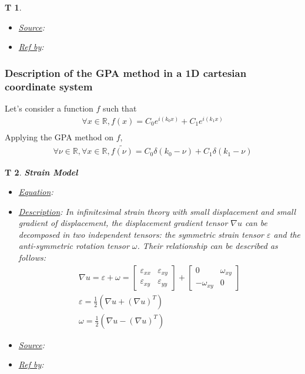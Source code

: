 \documentclass[12pt]{article}
\newtheorem{T}{T}
\begin{document}
\begin{T}
\begin{itemize}
\item \underline{Source}:
\item \underline{Ref by}:
\end{itemize}
\label{T_2}
\end{T}

\subsubsection*{Description of the GPA method in a 1D cartesian coordinate system}
Let's consider a function $f$ such that 
\begin{equation*}
\begin{gathered}
\forall x \in \mathbb{R}, f(x)=C_0e^{i(k_0x)}+C_1e^{i(k_1x)} \\
\end{gathered}
\end{equation*}
Applying the GPA method on $f$,
\begin{equation*}
\begin{gathered}
\forall \nu \in \mathbb{R}, \forall x \in \mathbb{R}, \widetilde{f(\nu)}=C_0\delta(k_0-\nu)+C_1\delta(k_1-\nu)
\end{gathered}
\end{equation*}
\begin{T}
\normalfont \textbf{Strain Model}
\begin{itemize}
\item \underline{Equation}: 
\item \underline{Description}: In infinitesimal strain theory with small displacement and small gradient of displacement, the displacement gradient tensor $\nabla u$ can be decomposed in two independent tensors: the symmetric strain tensor $\varepsilon$ and the anti-symmetric rotation tensor $\omega$. Their relationship can be described as follows:
\begin{equation}
\begin{gathered}
\nabla u = \varepsilon + \omega = \begin{bmatrix}
	\varepsilon_{xx} & \varepsilon_{xy} \\
	\varepsilon_{xy} & \varepsilon_{yy} 
	\end{bmatrix} + \begin{bmatrix}
	0 & \omega_{xy} \\
	-\omega_{xy} & 0 
	\end{bmatrix} \\ 
\varepsilon = \frac{1}{2}(\nabla u+(\nabla u)^{T}) \\
\omega = \frac{1}{2}(\nabla u-(\nabla u)^{T})
\end{gathered}
\label{eq:strain_2}
\end{equation}
\item \underline{Source}:
\item \underline{Ref by}:
\end{itemize}
\label{T_3}
\end{T}
\end{document}

